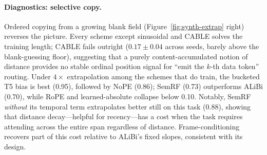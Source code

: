 {\paragraph{Diagnostics: selective copy.}
Ordered copying from a growing blank field (Figure~\ref{fig:synth-extrap}
right) reverses the picture. Every scheme except sinusoidal and CABLE solves
the training length; CABLE fails outright ($0.17 \pm 0.04$ across seeds,
barely above the blank-guessing floor), suggesting that a purely
content-accumulated notion of distance provides no stable ordinal position
signal for ``emit the $k$-th data token'' routing. Under $4\times$
extrapolation among the schemes that do train, the bucketed T5 bias is best
(0.95), followed by NoPE (0.86); SemRF (0.73) outperforms ALiBi (0.70), while
RoPE and learned-absolute collapse below 0.10. Notably, SemRF \emph{without}
its temporal term extrapolates better still on this task (0.88), showing that
distance decay---helpful for recency---has a cost when the task requires
attending across the entire span regardless of distance. Frame-conditioning
recovers part of this cost relative to ALiBi's fixed slopes, consistent with
its design.

}
